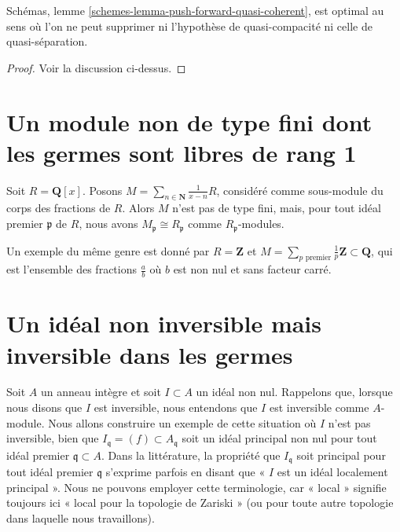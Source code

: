 \begin{lemma}
\label{lemma-pushforward-quasi-coherent}
Schémas, lemme \ref{schemes-lemma-push-forward-quasi-coherent},
est optimal au sens où l'on ne peut supprimer ni l'hypothèse
de quasi-compacité ni celle de quasi-séparation.
\end{lemma}

\begin{proof}
Voir la discussion ci-dessus.
\end{proof}








\section{Un module non de type fini dont les germes sont libres de rang 1}
\label{section-nonfree}

\noindent
Soit $R = \mathbf{Q}[x]$. Posons
$M = \sum_{n \in \mathbf{N}} \frac{1}{x - n}R$, considéré comme sous-module du
corps des fractions de $R$. Alors $M$ n'est pas de type fini, mais,
pour tout idéal premier $\mathfrak p$ de $R$, nous avons
$M_{\mathfrak p} \cong R_{\mathfrak p}$ comme
$R_{\mathfrak p}$-modules.

\medskip\noindent
Un exemple du même genre est donné par $R = \mathbf{Z}$ et
$M = \sum_{p \text{ premier}} \frac{1}{p} \mathbf{Z} \subset \mathbf{Q}$,
qui est l'ensemble des fractions $\frac{a}{b}$ où $b$ est non nul et
sans facteur carré.








\section{Un idéal non inversible mais inversible dans les germes}
\label{section-locally-invertible-not-invertible}

\noindent
Soit $A$ un anneau intègre et soit $I \subset A$ un idéal non nul.
Rappelons que, lorsque nous disons que $I$ est inversible, nous entendons que
$I$ est inversible comme $A$-module.
Nous allons construire un exemple de cette situation où
$I$ n'est pas inversible, bien que $I_\mathfrak q = (f) \subset A_\mathfrak q$
soit un idéal principal non nul pour tout idéal premier $\mathfrak q \subset A$.
Dans la littérature, la propriété que $I_\mathfrak q$ soit principal
pour tout idéal premier $\mathfrak q$ s'exprime parfois en
disant que « $I$ est un idéal localement principal ». Nous ne pouvons employer
cette terminologie, car « local » signifie toujours ici
« local pour la topologie de Zariski » (ou pour toute autre topologie dans
laquelle nous travaillons).

